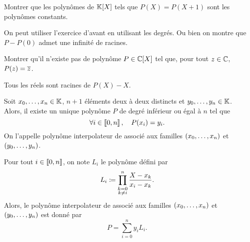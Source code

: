\documentclass{magnolia}
\begin{document}
\begin{exos}
\exo Montrer que les polynômes de $\polyK$ tels que $P(X)=P(X+1)$ sont les
  polynômes constants.
  \begin{sol}
  On peut utiliser l'exercice d'avant en utilisant les degrés. Ou bien on montre que $P-P(0)$ admet une  infinité de racines.
  \end{sol}
\exo Montrer qu'il n'existe pas de polynôme $P\in\polyC$ tel que, pour tout
  $z\in\mathbb{C}$, $P(z)=\overline{z}$.
  \begin{sol}
  Tous les réels sont racines de $P(X)-X$.
  \end{sol}
\end{exos}

\begin{proposition}[nom={Polyôme interpolateur de \nom{Lagrange}}]
Soit $x_0,\ldots,x_n\in\mathbb{K}$, $n+1$ éléments deux à deux distincts et $y_0,\ldots,y_n\in\mathbb{K}$. Alors,
il existe un unique polynôme $P$ de degré inférieur ou égal à $n$ tel que
\[\forall i\in\left\llbracket 0,n\right\rrbracket ,\quad P(x_i)=y_i.\]
On l'appelle polynôme interpolateur de  associé aux familles $\left(x_0,\ldots,x_{n}\right)$ et $\left(y_0,\ldots,y_{n}\right)$.
\end{proposition}

\begin{remarqueUnique}
\remarque  Pour tout $i\in\left\llbracket 0,n\right\rrbracket$, on note
$L_i$ le polynôme défini par
\[L_i\coloneqq \prod_{\substack{k=0\\k\neq i}}^{n} \frac{X-x_k}{x_i-x_k}.\]
Alors, le polynôme interpolateur de  associé aux familles $\left(x_0,\ldots,x_{n}\right)$ et $\left(y_0,\ldots,y_{n}\right)$ est donné par
\[P=\sum_{i=0}^{n} y_i L_i.\]
\end{remarqueUnique}
\end{document}
